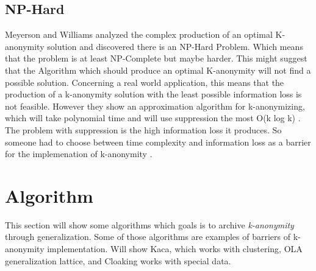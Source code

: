 \documentclass{llncs}
\begin{document}
\subsection{NP-Hard}
Meyerson and Williams analyzed the complex production of an optimal K-anonymity solution and discovered there is an NP-Hard Problem. Which means that the problem is at least NP-Complete but maybe harder. This might suggest that the Algorithm which should produce an optimal K-anonymity will not find a possible solution. Concerning a real world application, this means that the production of a k-anonymity solution with the least possible information loss is not feasible. However they show an approximation algorithm for k-anonymizing, which will take polynomial time and will use suppression the most O(k log k)  \cite{sweeney2002k}. The problem with suppression is the high information loss it produces. So someone had to choose between time complexity and information loss as a barrier for the implemenation of k-anonymity \cite{el2009globally}.
\section{Algorithm}
This section will show some algorithms which goals is to archive \textit{k-anonymity} through generalization. Some of those algorithms are examples of barriers of k-anonymity implementation. Will show Kaca, which works with clustering, OLA generalization lattice, and Cloaking works with special data.
\end{document}
